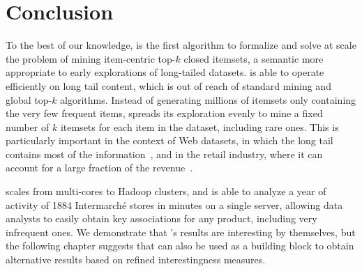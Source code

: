 \section{Conclusion}
\label{sec:toppi:conc}

To the best of our knowledge,
\toppi is the first algorithm to formalize and solve at scale
the problem of mining item-centric top-$k$ closed itemsets,
a semantic more appropriate to early explorations of long-tailed datasets.
\toppi is able to operate efficiently on long tail content,
which is out of reach of standard mining and global top-$k$ algorithms.
Instead of generating millions of itemsets only containing the very few frequent items,
\toppi spreads its exploration evenly to mine a fixed number of $k$ itemsets for each item in the dataset,
including rare ones.
This is particularly important in the context of Web datasets,
in which the long tail contains most of the information~\cite{GoelWSDM10},
and in the retail industry, where it can account for a large fraction of the revenue~\cite{Anderson2006}.

\toppi scales from multi-cores to Hadoop clusters,
and is able to analyze a year of activity of \num{1884} Intermarch\'e stores in minutes on a single server,
allowing data analysts to easily obtain key associations for any product,
including very infrequent ones.
We demonstrate that \toppi's results are interesting by themselves,
but the following chapter suggests that \toppi can also be used as a building block to obtain alternative results
based on refined interestingness measures.%
